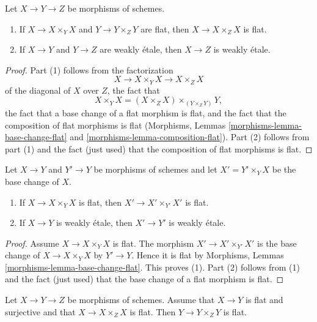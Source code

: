 \begin{lemma}
\label{lemma-composition-weakly-etale}
Let $X \to Y \to Z$ be morphisms of schemes.
\begin{enumerate}
\item If $X \to X \times_Y X$ and $Y \to Y \times_Z Y$ are flat,
then $X \to X \times_Z X$ is flat.
\item If $X \to Y$ and $Y \to Z$ are weakly \'etale, then
$X \to Z$ is weakly \'etale.
\end{enumerate}
\end{lemma}

\begin{proof}
Part (1) follows from the factorization
$$
X \to X \times_Y X \to X \times_Z X
$$
of the diagonal of $X$ over $Z$, the fact that
$$
X \times_Y X = (X \times_Z X) \times_{(Y \times_Z Y)} Y,
$$
the fact that a base change of a flat morphism is flat, and
the fact that the composition of flat morphisms is flat
(Morphisms, Lemmas \ref{morphisms-lemma-base-change-flat} and
\ref{morphisms-lemma-composition-flat}).
Part (2) follows from part (1) and the fact (just used)
that the composition of flat morphisms is flat.
\end{proof}

\begin{lemma}
\label{lemma-base-change-weakly-etale}
Let $X \to Y$ and $Y' \to Y$ be morphisms of schemes and let
$X' = Y' \times_Y X$ be the base change of $X$.
\begin{enumerate}
\item If $X \to X \times_Y X$ is flat, then $X' \to X' \times_{Y'} X'$
is flat.
\item If $X \to Y$ is weakly \'etale, then $X' \to Y'$ is weakly \'etale.
\end{enumerate}
\end{lemma}

\begin{proof}
Assume $X \to X \times_Y X$ is flat. The morphism $X' \to X' \times_{Y'} X'$
is the base change of $X \to X \times_Y X$ by $Y' \to Y$. Hence it
is flat by Morphisms, Lemmas \ref{morphisms-lemma-base-change-flat}.
This proves (1). Part (2) follows from (1) and the fact (just used)
that the base change of a flat morphism is flat.
\end{proof}

\begin{lemma}
\label{lemma-go-down}
Let $X \to Y \to Z$ be morphisms of schemes. Assume that $X \to Y$ is
flat and surjective and that $X \to X \times_Z X$ is flat.
Then $Y \to Y \times_Z Y$ is flat.
\end{lemma}

